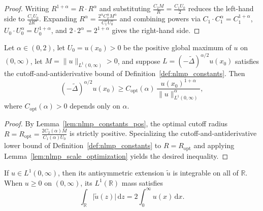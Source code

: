 \begin{proof}
\leanok
Writing $R^{1 + \alpha} = R \cdot R^\alpha$ and substituting $\frac{C_2 M}{R} = \frac{C_1 U_0}{2}$ reduces the left-hand side to $\frac{C_1 U_0}{2 R^\alpha}$. Expanding $R^\alpha = \frac{2^\alpha C_2^\alpha M^\alpha}{C_1^\alpha U_0^\alpha}$ and combining powers via $C_1 \cdot C_1^\alpha = C_1^{1 + \alpha}$, $U_0 \cdot U_0^\alpha = U_0^{1 + \alpha}$, and $2 \cdot 2^\alpha = 2^{1 + \alpha}$ gives the right-hand side.
\end{proof}

\begin{theorem}\label{thm:nonlinear_max_principle}
\leanok
Let $\alpha \in (0, 2)$, let $U_0 = u(x_0) > 0$ be the positive global maximum of $u$ on $(0, \infty)$, let $M = \lVert u \rVert_{L^1(0, \infty)} > 0$, and suppose $L = (-\widetilde{\Delta})^{\alpha/2} u(x_0)$ satisfies the cutoff-and-antiderivative bound of Definition~\ref{def:nlmp_constants}. Then
\[
  (-\widetilde{\Delta})^{\alpha/2} u(x_0) \ge C_{\mathrm{opt}}(\alpha)\, \frac{u(x_0)^{1 + \alpha}}{\lVert u \rVert_{L^1(0, \infty)}^\alpha},
\]
where $C_{\mathrm{opt}}(\alpha) > 0$ depends only on $\alpha$.
\end{theorem}

\begin{proof}
\leanok
By Lemma~\ref{lem:nlmp_constants_pos}, the optimal cutoff radius $R = R_{\mathrm{opt}} = \frac{2 C_2(\alpha) M}{C_1(\alpha) U_0}$ is strictly positive. Specializing the cutoff-and-antiderivative lower bound of Definition~\ref{def:nlmp_constants} to $R = R_{\mathrm{opt}}$ and applying Lemma~\ref{lem:nlmp_scale_optimization} yields the desired inequality.
\end{proof}

\begin{lemma}\label{lem:odd_ext_integrable_and_norm}
\leanok
If $u \in L^1(0, \infty)$, then its antisymmetric extension $\widetilde{u}$ is integrable on all of $\mathbb{R}$. When $u \ge 0$ on $(0, \infty)$, its $L^1(\mathbb{R})$ mass satisfies
\[
  \int_{\mathbb{R}} \lvert \widetilde{u}(z) \rvert \, \mathrm{d}z = 2 \int_0^\infty u(x)\, \mathrm{d}x.
\]
\end{lemma}

